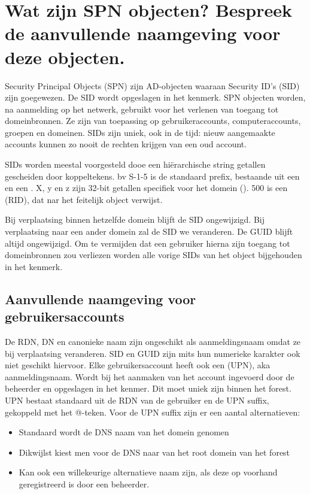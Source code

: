 \section{Wat zijn SPN objecten? Bespreek de aanvullende naamgeving voor deze
objecten.}

Security Principal Objects (SPN) zijn AD-objecten waaraan Security ID's (SID)
zijn goegewezen. De SID wordt opgeslagen in het  kenmerk.
SPN objecten worden, na aanmelding op het netwerk, gebruikt voor het verlenen
van toegang tot domeinbronnen. Ze zijn van toepassing op gebruikeraccounts,
computeraccounts, groepen en domeinen. SIDs zijn uniek, ook in de tijd: nieuw
aangemaakte accounts kunnen zo nooit de rechten krijgen van een oud account.

SIDs worden meestal voorgesteld dooe een hiërarchische string getallen
gescheiden door koppeltekens. bv  S-1-5 is de standaard
prefix, bestaande uit een  en een . X, y en z zijn 32-bit getallen specifiek voor het domein
(). 500 is een 
(RID), dat nar het feitelijk object verwijst.

Bij verplaatsing binnen hetzelfde domein blijft de SID ongewijzigd. Bij
verplaatsing naar een ander domein zal de SID we veranderen. De GUID blijft
altijd ongewijzigd. Om te vermijden dat een gebruiker hierna zijn toegang tot
domeinbronnen zou verliezen worden alle vorige SIDs van het object bijgehouden
in het  kenmerk.

\subsection{Aanvullende naamgeving voor gebruikersaccounts}

De RDN, DN en canonieke naam zijn ongeschikt als aanmeldingsnaam omdat ze bij
verplaatsing veranderen. SID en GUID zijn mits hun numerieke karakter ook niet
geschikt hiervoor. Elke gebruikersaccount heeft ook een  (UPN), aka aanmeldingsnaam. Wordt bij het aanmaken van het account
ingevoerd door de beheerder en opgeslagen in het 
kenmer. Dit moet uniek zijn binnen het forest. UPN bestaat standaard uit de RDN
van de gebruiker en de UPN suffix, gekoppeld met het @-teken.
Voor de UPN suffix zijn er een aantal alternatieven:
\begin{itemize}
	\item Standaard wordt de DNS naam van het domein genomen
	\item Dikwijlst kiest men voor de DNS naar van het root domein van het
		forest
	\item Kan ook een willekeurige alternatieve naam zijn, als deze op
		voorhand geregistreerd is door een beheerder.
\end{itemize}

